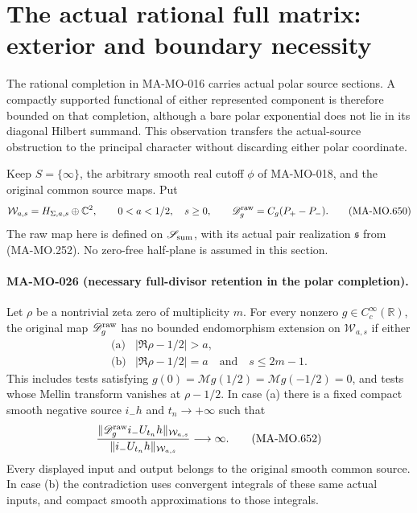 \section{The actual rational full matrix: exterior and boundary necessity}
\label{sec:polar-exterior-obstruction}

The rational completion in MA-MO-016 carries actual polar source
sections. A compactly supported functional of either represented
component is therefore bounded on that completion, although a bare
polar exponential does not lie in its diagonal Hilbert summand.
This observation transfers the actual-source obstruction to the
principal character without discarding either polar coordinate.

Keep \(S=\{\infty\}\), the arbitrary smooth real cutoff \(\phi\)
of MA-MO-018, and the original common source maps. Put
\[
 \mathcal W_{a,s}=H_{\Sigma,a,s}\oplus\mathbb C^2,
 \qquad 0<a<1/2,\quad s\geq0,\qquad
 \mathscr D_g^{\rm raw}=C_g(P_+-P_-).
 \tag{MA-MO.650}
\]
The raw map here is defined on \(\mathscr S_{\rm sum}\), with
its actual pair realization \(\mathfrak s\) from (MA-MO.252).
No zero-free half-plane is assumed in this section.

\paragraph{MA-MO-026 (necessary full-divisor retention in the polar completion).}
Let \(\rho\) be a nontrivial zeta zero of multiplicity \(m\).
For every nonzero \(g\in C_c^\infty(\mathbb R)\), the original
map \(\mathscr D_g^{\rm raw}\) has no bounded endomorphism
extension on \(\mathcal W_{a,s}\) if either
\[
 \begin{array}{ll}
 \text{(a)}&|\Re\rho-1/2|>a,\\
 \text{(b)}&|\Re\rho-1/2|=a\quad\text{and}\quad s\leq2m-1.
 \end{array}
 \tag{MA-MO.651}
\]
This includes tests satisfying
\(g(0)=\mathcal Mg(1/2)=\mathcal Mg(-1/2)=0\), and tests
whose Mellin transform vanishes at \(\rho-1/2\). In case (a)
there is a fixed compact smooth negative source \(i_-h\) and
\(t_n\to+\infty\) such that
\[
 \frac{\|\mathscr D_g^{\rm raw}i_-U_{t_n}h\|_{\mathcal W_{a,s}}}
      {\|i_-U_{t_n}h\|_{\mathcal W_{a,s}}}\longrightarrow\infty.
 \tag{MA-MO.652}
\]
Every displayed input and output belongs to the original smooth
common source. In case (b) the contradiction uses convergent
integrals of these same actual inputs, and compact smooth
approximations to those integrals.

